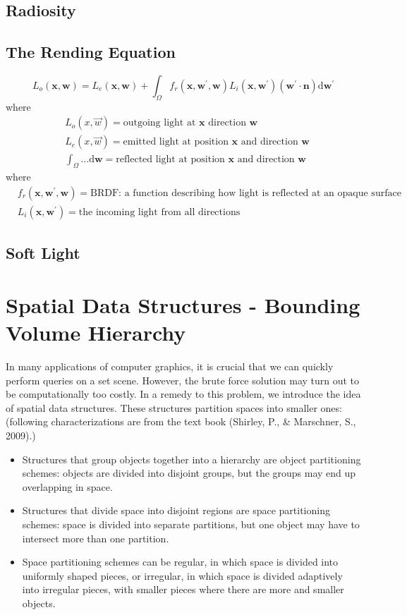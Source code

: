 \documentclass[11pt]{article}
\newcommand{\bn}{\mathbf{n}}
\newcommand{\bw}{\mathbf{w}}
\newcommand{\bx}{\mathbf{x}}
\begin{document}
\subsection{Radiosity}
\subsection{The Rending Equation}
\begin{equation}
	L_{o}(\bx, \bw)
	=
	L_{e}(\bx, \bw) 
	+
	\int_{\Omega} f_{r}\left(\bx, \bw^{\prime}, \bw\right) L_{i}\left(\bx, \bw^{\prime}\right)\left(\bw^{\prime} \cdot \bn\right) \mathrm{d} \bw^{\prime}
\end{equation}
where 
\begin{align}
	&L_{o}(x, \vec{w}) = \text{outgoing light at $\bx$ direction $\bw$} \\
	&L_{e}(x, \vec{w}) = \text{emitted light at position $\bx$ and direction $\bw$} \\
	&\int_\Omega \dots \mathrm d \bw = \text{reflected light at position $\bx$ and direction $\bw$}
\end{align}
where 
\begin{align}
	&f_{r}\left(\bx, \bw^{\prime}, \bw\right) 
	= \text{BRDF: a function describing how light is reflected at an opaque surface} \\
	&L_{i}\left(\bx, \bw^{\prime}\right) 
	= \text{the incoming light from all directions}
\end{align}
\subsection{Soft Light}


\section{Spatial Data Structures - Bounding Volume Hierarchy}
In many applications of computer graphics, it is crucial that we can quickly perform queries on a set scene. However, the brute force solution may turn out to be computationally too costly. In a remedy to this problem, we introduce the idea of spatial data structures. These structures partition spaces into smaller ones: (following characterizations are from the text book (Shirley, P., \& Marschner, S., 2009).)
\begin{itemize}
	\item Structures that group objects together into a hierarchy are object partitioning schemes: objects are divided into disjoint groups, but the groups may end up overlapping in space.
	\item Structures that divide space into disjoint regions are space partitioning schemes: space is divided into separate partitions, but one object may have to intersect more than one partition.
	\item Space partitioning schemes can be regular, in which space is divided into uniformly shaped pieces, or irregular, in which space is divided adaptively into irregular pieces, with smaller pieces where there are more and smaller objects.
\end{itemize}
\end{document}
